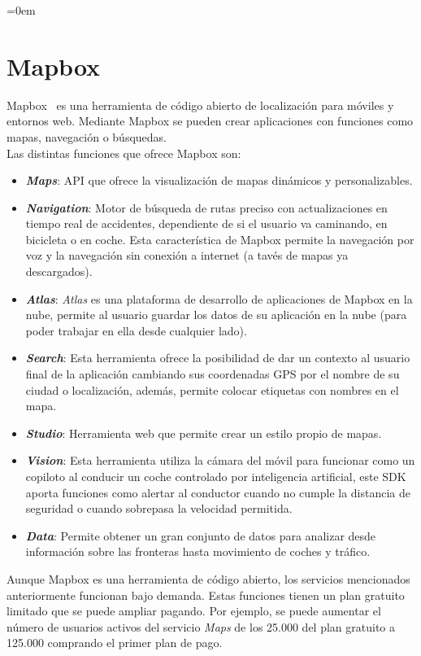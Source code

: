 \parindent=0em
\section{Mapbox}
\label{mapboxpunto}
\noindent

Mapbox~\cite{mapboxMainPage} es una herramienta de código abierto de localización para móviles y entornos web. Mediante Mapbox se pueden crear aplicaciones con funciones como mapas, navegación o búsquedas.\\

Las distintas funciones que ofrece Mapbox son:

\begin{itemize}
    \item \textit{\textbf{Maps}}: API que ofrece la visualización de mapas dinámicos y personalizables.
    
    \item \textit{\textbf{Navigation}}: Motor de búsqueda de rutas preciso con actualizaciones en tiempo real de accidentes, dependiente de si el usuario va caminando, en bicicleta o en coche. Esta característica de Mapbox permite la navegación por voz y la navegación sin conexión a internet (a tavés de mapas ya descargados).

    \item \textit{\textbf{Atlas}}: \textit{Atlas} es una plataforma de desarrollo de aplicaciones de Mapbox en la nube, permite al usuario guardar los datos de su aplicación en la nube (para poder trabajar en ella desde cualquier lado).
    
    \item \textit{\textbf{Search}}: Esta herramienta ofrece la posibilidad de dar un contexto al usuario final de la aplicación cambiando sus coordenadas GPS por el nombre de su ciudad o localización, además, permite colocar etiquetas con nombres en el mapa.
    
    \item \textit{\textbf{Studio}}: Herramienta web que permite crear un estilo propio de mapas.
    
    \item \textit{\textbf{Vision}}: Esta herramienta utiliza la cámara del móvil para funcionar como un copiloto al conducir un coche controlado por inteligencia artificial, este SDK aporta funciones como alertar al conductor cuando no cumple la distancia de seguridad o cuando sobrepasa la velocidad permitida.
    
    \item \textit{\textbf{Data}}: Permite obtener un gran conjunto de datos para analizar desde información sobre las fronteras hasta movimiento de coches y tráfico.
\end{itemize}

Aunque Mapbox es una herramienta de código abierto, los servicios mencionados anteriormente funcionan bajo demanda. Estas funciones tienen un plan gratuito limitado que se puede ampliar pagando. Por ejemplo, se puede aumentar el número de usuarios activos del servicio \textit{Maps} de los 25.000 del plan gratuito a 125.000 comprando el primer plan de pago.